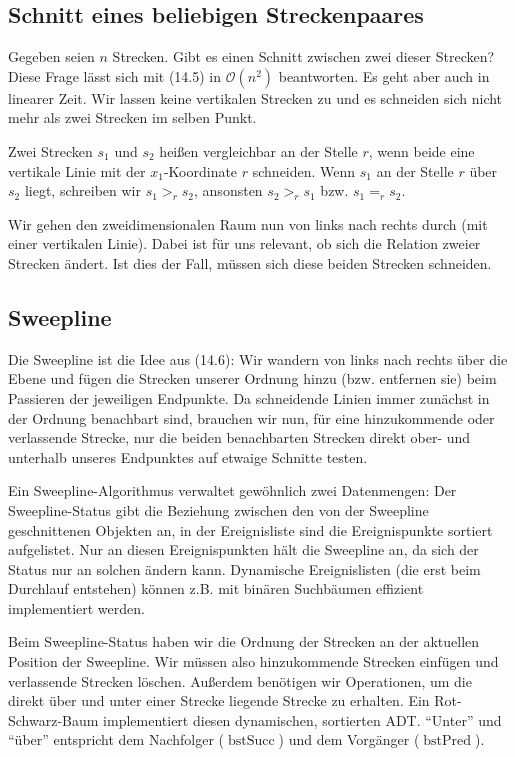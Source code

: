 \documentclass[12pt]{article}
\begin{document}
\subsection{Schnitt eines beliebigen Streckenpaares}

Gegeben seien $n$ Strecken. Gibt es einen Schnitt zwischen zwei dieser Strecken? Diese Frage lässt sich mit (14.5) in $\mathcal O(n^2)$ beantworten. Es geht aber auch in linearer Zeit. Wir lassen keine vertikalen Strecken zu und es schneiden sich nicht mehr als zwei Strecken im selben Punkt.

Zwei Strecken $s_1$ und $s_2$ heißen vergleichbar an der Stelle $r$, wenn beide eine vertikale Linie mit der $x_1$-Koordinate $r$ schneiden. Wenn $s_1$ an der Stelle $r$ über $s_2$ liegt, schreiben wir $s_1 >_r s_2$, ansonsten $s_2 >_r s_1$ bzw. $s_1 =_r s_2$.

Wir gehen den zweidimensionalen Raum nun von links nach rechts durch (mit einer vertikalen Linie). Dabei ist für uns relevant, ob sich die Relation zweier Strecken ändert. Ist dies der Fall, müssen sich diese beiden Strecken schneiden.

\subsection{Sweepline}

Die Sweepline ist die Idee aus (14.6): Wir wandern von links nach rechts über die Ebene und fügen die Strecken unserer Ordnung hinzu (bzw. entfernen sie) beim Passieren der jeweiligen Endpunkte. Da schneidende Linien immer zunächst in der Ordnung benachbart sind, brauchen wir nun, für eine hinzukommende oder verlassende Strecke, nur die beiden benachbarten Strecken direkt ober- und unterhalb unseres Endpunktes auf etwaige Schnitte testen.

Ein Sweepline-Algorithmus verwaltet gewöhnlich zwei Datenmengen: Der Sweepline-Status gibt die Beziehung zwischen den von der Sweepline geschnittenen Objekten an, in der Ereignisliste sind die Ereignispunkte sortiert aufgelistet. Nur an diesen Ereignispunkten hält die Sweepline an, da sich der Status nur an solchen ändern kann. Dynamische Ereignislisten (die erst beim Durchlauf entstehen) können z.B. mit binären Suchbäumen effizient implementiert werden.

Beim Sweepline-Status haben wir die Ordnung der Strecken an der aktuellen Position der Sweepline. Wir müssen also hinzukommende Strecken einfügen und verlassende Strecken löschen. Außerdem benötigen wir Operationen, um die direkt über und unter einer Strecke liegende Strecke zu erhalten. Ein Rot-Schwarz-Baum implementiert diesen dynamischen, sortierten ADT. \enquote{Unter} und \enquote{über} entspricht dem Nachfolger ($\operatorname{bstSucc}$) und dem Vorgänger ($\operatorname{bstPred}$).
\end{document}
